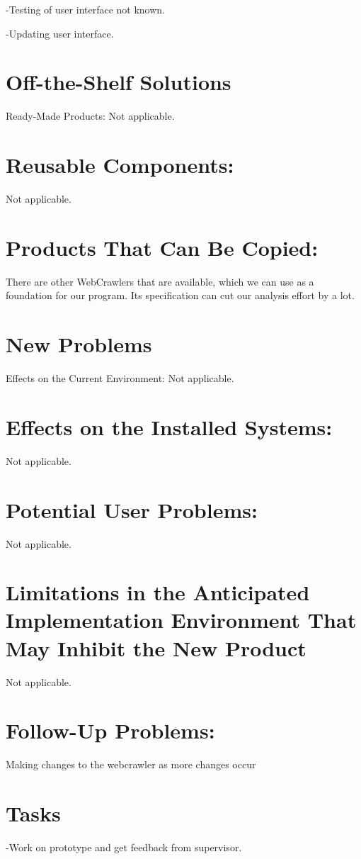 \documentclass[12pt]{article}
\begin{document}
-Testing of user interface not known.

-Updating user interface.

\section*{Off-the-Shelf Solutions }
Ready-Made Products:
Not applicable.

\section*{Reusable Components:}
Not applicable.

\section*{Products That Can Be Copied:}
There are other WebCrawlers that are available, which we can use as a foundation for our program. Its specification can cut our analysis effort by a lot.

\section*{New Problems }
Effects on the Current Environment:
Not applicable.

\section*{Effects on the Installed Systems:}
Not applicable.

\section*{Potential User Problems:}
Not applicable.


\section*{Limitations in the Anticipated Implementation Environment That May Inhibit the New Product}

Not applicable.

\section*{Follow-Up Problems:}
Making changes to the webcrawler as more changes occur 

\section*{Tasks} 
-Work on prototype and get feedback from supervisor.\\
\end{document}
